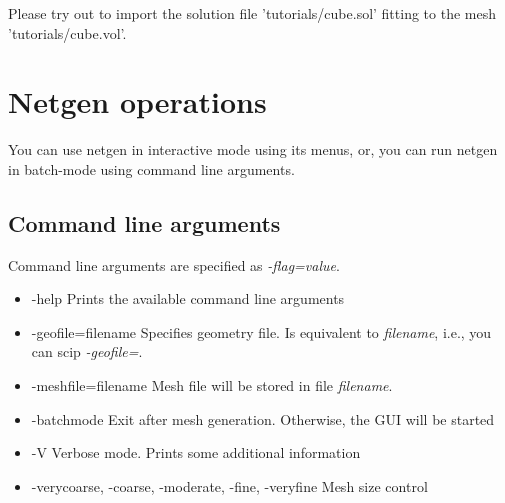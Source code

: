 \documentclass[12pt]{book}
\begin{document}
Please try out to import the solution file 'tutorials/cube.sol' fitting
to the mesh 'tutorials/cube.vol'.


\chapter{Netgen operations}
You can use netgen in interactive mode using its menus, or, you
can run netgen in batch-mode using command line arguments.

\section{Command line arguments}
Command line arguments are specified as {\it -flag=value}.
\begin{itemize}
\item -help \newline
Prints the available command line arguments
\item -geofile=filename \newline
Specifies geometry file. Is equivalent to {\it filename}, i.e., you can
scip {\it -geofile=}.
\item -meshfile=filename \newline
Mesh file will be stored in file {\it filename}.
\item -batchmode \newline
Exit after mesh generation. Otherwise, the GUI will be started
\item -V \newline
Verbose mode. Prints some additional information 
\item -verycoarse, -coarse, -moderate, -fine, -veryfine \newline
Mesh size control
\end{itemize}
\end{document}
